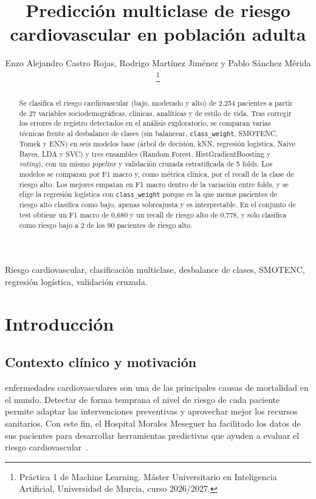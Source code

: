 \documentclass[journal,onecolumn]{IEEEtran}
\begin{document}
\title{Predicción multiclase de riesgo cardiovascular en población adulta}

\author{Enzo Alejandro Castro Rojas, Rodrigo Martínez Jiménez y Pablo Sánchez Mérida
\thanks{Práctica 1 de Machine Learning.
Máster Universitario en Inteligencia Artificial, Universidad de Murcia, curso 2026/2027.}}

\maketitle

\begin{abstract}
Se clasifica el riesgo cardiovascular (bajo, moderado y alto) de 2.254 pacientes a partir de 27
variables sociodemográficas, clínicas, analíticas y de estilo de vida.
Tras corregir los errores de registro detectados en el análisis exploratorio, se comparan varias
técnicas frente al desbalance de clases (sin balancear, \texttt{class\_weight}, SMOTENC, Tomek y ENN)
en seis modelos base (árbol de decisión, kNN, regresión logística, Naive Bayes, LDA y SVC) y tres
ensambles (Random Forest, HistGradientBoosting y \textit{voting}), con un mismo \textit{pipeline} y
validación cruzada estratificada de 5 folds.
Los modelos se comparan por F1 macro y, como métrica clínica, por el recall de la clase de riesgo alto.
Los mejores empatan en F1 macro dentro de la variación entre folds, y se elige la regresión logística
con \texttt{class\_weight} porque es la que menos pacientes de riesgo alto clasifica como bajo, apenas
sobreajusta y es interpretable.
En el conjunto de test obtiene un F1 macro de 0,680 y un recall de riesgo alto de 0,778, y solo
clasifica como riesgo bajo a 2 de los 90 pacientes de riesgo alto.
\end{abstract}

\begin{IEEEkeywords}
Riesgo cardiovascular, clasificación multiclase, desbalance de clases, SMOTENC, regresión logística,
validación cruzada.
\end{IEEEkeywords}

\section{Introducción}
\subsection{Contexto clínico y motivación}
 enfermedades cardiovasculares son una de las principales causas de
mortalidad en el mundo.
Detectar de forma temprana el nivel de riesgo de cada paciente permite adaptar las intervenciones
preventivas y aprovechar mejor los recursos sanitarios.
Con este fin, el Hospital Morales Meseguer ha facilitado los datos de sus pacientes para desarrollar
herramientas predictivas que ayuden a evaluar el riesgo cardiovascular~\cite{enunciado}.
\end{document}
